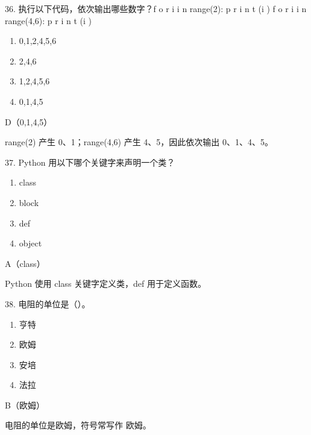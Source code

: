 \begin{question}{36. 执行以下代码，依次输出哪些数字？f o r i i n range(2): p r i n t (i ) f o r i i n range(4,6): p r i n t (i )}
\begin{enumerate}[label=\Alph*., leftmargin=2.4em, itemsep=0.2em]
\item 0,1,2,4,5,6
\item 2,4,6
\item 1,2,4,5,6
\item 0,1,4,5
\end{enumerate}
\end{question}
\begin{answer}
D（0,1,4,5）
\end{answer}
\begin{explanation}
range(2) 产生 0、1；range(4,6) 产生 4、5，因此依次输出 0、1、4、5。
\end{explanation}

\begin{question}{37. Python 用以下哪个关键字来声明一个类？}
\begin{enumerate}[label=\Alph*., leftmargin=2.4em, itemsep=0.2em]
\item class
\item block
\item def
\item object
\end{enumerate}
\end{question}
\begin{answer}
A（class）
\end{answer}
\begin{explanation}
Python 使用 class 关键字定义类，def 用于定义函数。
\end{explanation}

\begin{question}{38. 电阻的单位是（）。}
\begin{enumerate}[label=\Alph*., leftmargin=2.4em, itemsep=0.2em]
\item 亨特
\item 欧姆
\item 安培
\item 法拉
\end{enumerate}
\end{question}
\begin{answer}
B（欧姆）
\end{answer}
\begin{explanation}
电阻的单位是欧姆，符号常写作 欧姆。
\end{explanation}

